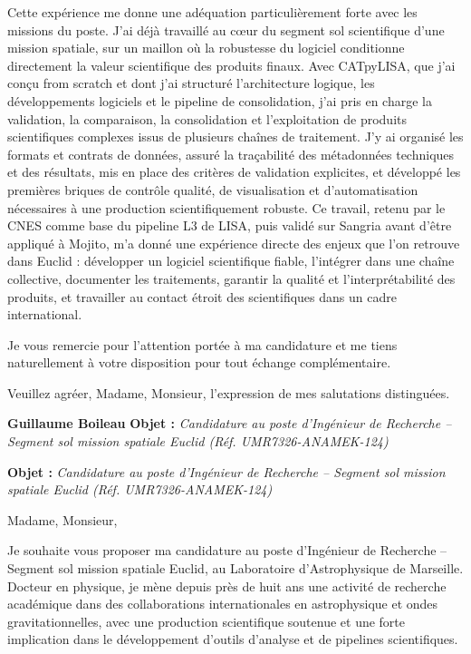 \documentclass[11pt,a4paper]{altacv}
\begin{document}
{{Cette expérience me donne une adéquation particulièrement forte avec les missions du poste. J'ai déjà travaillé au cœur du segment sol scientifique d'une mission spatiale, sur un maillon où la robustesse du logiciel conditionne directement la valeur scientifique des produits finaux. Avec CATpyLISA, que j'ai conçu from scratch et dont j'ai structuré l'architecture logique, les développements logiciels et le pipeline de consolidation, j'ai pris en charge la validation, la comparaison, la consolidation et l'exploitation de produits scientifiques complexes issus de plusieurs chaînes de traitement. J'y ai organisé les formats et contrats de données, assuré la traçabilité des métadonnées techniques et des résultats, mis en place des critères de validation explicites, et développé les premières briques de contrôle qualité, de visualisation et d'automatisation nécessaires à une production scientifiquement robuste. Ce travail, retenu par le CNES comme base du pipeline L3 de LISA, puis validé sur Sangria avant d'être appliqué à Mojito, m'a donné une expérience directe des enjeux que l'on retrouve dans Euclid : développer un logiciel scientifique fiable, l'intégrer dans une chaîne collective, documenter les traitements, garantir la qualité et l'interprétabilité des produits, et travailler au contact étroit des scientifiques dans un cadre international.

Je vous remercie pour l'attention portée à ma candidature et me tiens naturellement à votre disposition pour tout échange complémentaire.

Veuillez agréer, Madame, Monsieur, l'expression de mes salutations distinguées.

\textbf{Guillaume Boileau}
{\color{accent}\textbf{Objet :}} \textit{Candidature au poste d'Ingénieur de Recherche -- Segment sol mission spatiale Euclid (Réf. UMR7326-ANAMEK-124)}

{\color{body}
\fi
{\color{accent}\textbf{Objet :}} \textit{Candidature au poste d'Ingénieur de Recherche -- Segment sol mission spatiale Euclid (Réf. UMR7326-ANAMEK-124)}

{\color{body}

Madame, Monsieur,

Je souhaite vous proposer ma candidature au poste d'Ingénieur de Recherche -- Segment sol mission spatiale Euclid, au Laboratoire d'Astrophysique de Marseille. Docteur en physique, je mène depuis près de huit ans une activité de recherche académique dans des collaborations internationales en astrophysique et ondes gravitationnelles, avec une production scientifique soutenue et une forte implication dans le développement d'outils d'analyse et de pipelines scientifiques.

}}}}
\end{document}

